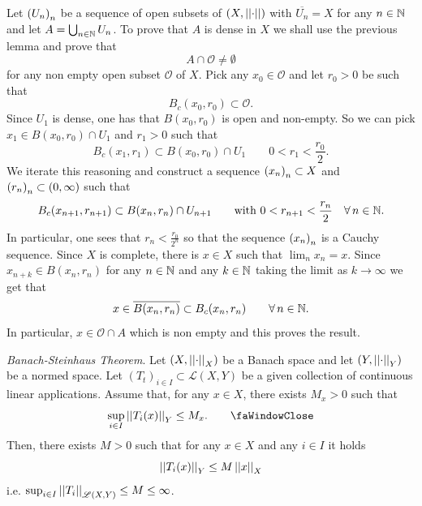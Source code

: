 \documentclass{article}
\begin{document}
\begin{fancyproof}
	Let ${\left({U}_{n}\right)}_{n}$ be a sequence of open subsets of $\left(X,\left|\left|\cdot\right|\right|\right)$ with $\overline{U_{n}}=X$ for any $n\in\mathbb{N}$ and let $A=\bigcup_{n\in\mathbb{N}}U_{n}$. To prove that $A$ is dense in $X$ we shall use the previous lemma and prove that 
	\begin{equation*}
		A\cap\mathcal{O}\neq\emptyset
	\end{equation*}
	for any non empty open subset $\mathcal{O}$ of $X$. Pick any $x_{0}\in\mathcal{O}$ and let $r_{0}>0$ be such that
	\begin{equation*}
		B_{c}(x_{0},r_{0})\subset\mathcal{O}.
	\end{equation*}
	Since $U_{1}$ is dense, one has that $B(x_{0},r_{0})$ is open and non-empty. So we can pick $x_{1}\in B(x_{0},r_{0})\cap U_{1}$ and $r_{1}>0$ such that
	\begin{equation*}
		B_{c}(x_{1},r_{1})\subset B(x_{0},r_{0})\cap U_{1}\qquad0<r_{1}<\frac{r_{0}}{2}.
	\end{equation*}
	We iterate this reasoning and construct a sequence ${\left({x}_{n}\right)}_{n}\subset{X}$ and ${\left({r}_{n}\right)}_{n}\subset(0,\infty)$ such that
	\begin{equation*}
		B_{c}(x_{n+1},r_{n+1})\subset B(x_{n},r_{n})\cap U_{n+1}\qquad\text{with }0<r_{n+1}<\frac{r_{n}}{2}\quad\forall\, n\in\mathbb{N}.
	\end{equation*}
	In particular, one sees that $r_{n}<\frac{r_{0}}{2^{n}}$ so that the sequence ${\left({x}_{n}\right)}_{n}$ is a Cauchy sequence. Since $X$ is complete, there is $x\in X$ such that $\lim_{n}x_{n}=x$. Since $x_{n+k}\in B(x_{n},r_{n})$ for any $n\in\mathbb{N}$ and any $k\in\mathbb{N}$ taking the limit as $k\to\infty$ we get that
	\begin{equation*}
		x\in\overline{B(x_{n},r_{n})}\subset B_{c}(x_{n},r_{n})\qquad\forall\, n\in\mathbb{N}.
	\end{equation*}
	In particular, $x\in\mathcal{O}\cap A$ which is non empty and this proves the result.
\end{fancyproof}
\begin{theorem}
	\emph{Banach-Steinhaus Theorem}. Let $\left(X,\left|\left|\cdot\right|\right|_{X}\right)$ be a Banach space and let $\left(Y,\left|\left|\cdot\right|\right|_{Y}\right)$ be a normed space. Let $\left(T_{t}\right)_{i\in I}\subset\mathscr{L}(X,Y)$ be a given collection of continuous linear applications. Assume that, for any $x\in X$, there exists $M_{x}>0$ such that
	\begin{equation*}
		\sup_{i\in I}\norm{T_{i}(x)}_{Y}\leq M_{x}.\tag*{\faWindowClose}\label{winmax}
	\end{equation*}
	Then, there exists $M>0$ such that for any $x\in X$ and any $i\in I$ it holds
	\begin{equation*}
		\left|\left|T_{i}(x)\right|\right|_{Y}\leq M\left|\left|x\right|\right|_{X}
	\end{equation*}
	i.e. $\sup_{i\in I}\left|\left|T_{i}\right|\right|_{\mathscr{L}(X,Y)}\leq M\leq\infty$.
\end{theorem}
\end{document}
